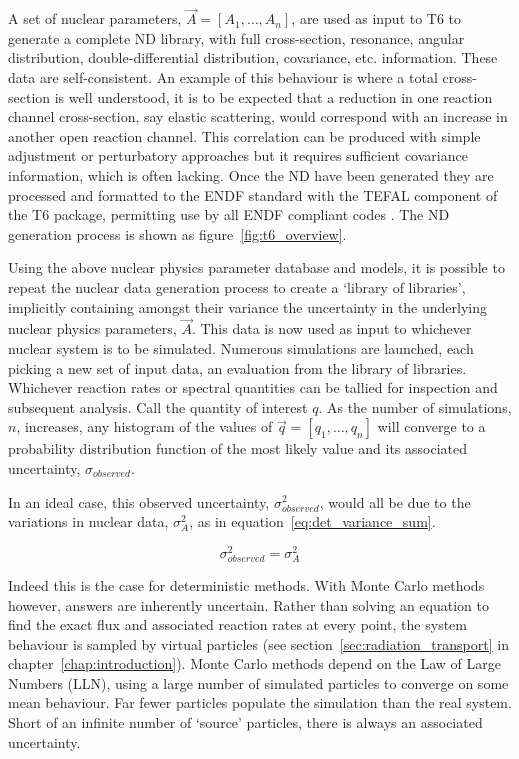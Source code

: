 A set of nuclear parameters, $\vec{A} = [A_{1},\ldots,A_{n}]$, are used as input to T6 to generate a complete ND library, with full cross-section, resonance, angular distribution, double-differential distribution, covariance, etc. information. These data are self-consistent. An example of this behaviour is where a total cross-section is well understood, it is to be expected that a reduction in one reaction channel cross-section, say elastic scattering, would correspond with an increase in another open reaction channel. This correlation can be produced with simple adjustment or perturbatory approaches but it requires sufficient covariance information, which is often lacking. Once the ND have been generated they are processed and formatted to the ENDF standard with the TEFAL component of the T6 package, permitting use by all ENDF compliant codes \cite{Koning2012}. The ND generation process is shown as figure~\ref{fig:t6_overview}.

Using the above nuclear physics parameter database and models, it is possible to repeat the nuclear data generation process to create a `library of libraries', implicitly containing amongst their variance the uncertainty in the underlying nuclear physics parameters, $\vec{A}$. This data is now used as input to whichever nuclear system is to be simulated. Numerous simulations are launched, each picking a new set of input data, an evaluation from the library of libraries. Whichever reaction rates or spectral quantities can be tallied for inspection and subsequent analysis. Call the quantity of interest $q$. As the number of simulations, $n$, increases, any histogram of the values of $\vec{q} = [q_{1},\ldots,q_{n}]$ will converge to a probability distribution function of the most likely value and its associated uncertainty, $\sigma_{observed}$. 

In an ideal case, this observed uncertainty, $\sigma_{observed}^{2}$, would all be due to the variations in nuclear data, $\sigma_{A}^{2}$, as in equation~\ref{eq:det_variance_sum}.

\begin{equation}
  \label{eq:det_variance_sum}
  \sigma_{observed}^{2} = \sigma_{A}^{2} 
\end{equation}

Indeed this is the case for deterministic methods. With Monte Carlo methods however, answers are inherently uncertain. Rather than solving an equation to find the exact flux and associated reaction rates at every point, the system behaviour is sampled by virtual particles (see section~\ref{sec:radiation_transport} in chapter~\ref{chap:introduction}). Monte Carlo methods depend on the Law of Large Numbers (LLN), using a large number of simulated particles to converge on some mean behaviour. Far fewer particles populate the simulation than the real system. Short of an infinite number of `source' particles, there is always an associated uncertainty. 

